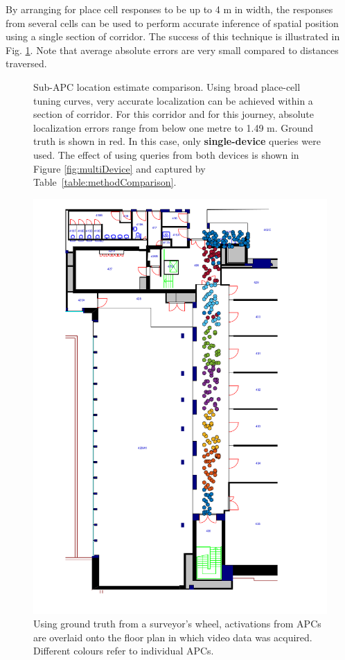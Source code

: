 By arranging for place cell responses to be up to 4 m in width, the responses from several cells can be used to perform accurate inference of spatial position using a single section of corridor.  The success of this technique is illustrated in Fig. \ref{fig:sublocMethodComp}. Note that average absolute errors are very small compared to distances traversed.





\begin{figure}
\centering
	\setlength{}
	\setlength{}
		
\caption{Sub-APC location estimate comparison. Using broad place-cell tuning curves, very accurate localization can
be achieved within a section of corridor. For this corridor and for this journey,
absolute localization errors range from below one metre to 1.49 m. Ground truth is shown in red. In this case, only \textbf{single-device} queries were used. The effect of using queries from both devices is shown in Figure \ref{fig:multiDevice} and captured by Table~\ref{table:methodComparison}.}
\label{fig:sublocMethodComp}
\end{figure}

\begin{figure}
\centering
\includegraphics[height=\linewidth]{gfx/Chapter05/placeCellsExperiment_withDetection_5px.png}
\caption{Using ground truth from a surveyor's wheel, activations from APCs are overlaid onto the floor plan in which video data was acquired. Different colours refer to individual APCs.}
\label{fig:floorplan}
\end{figure}

